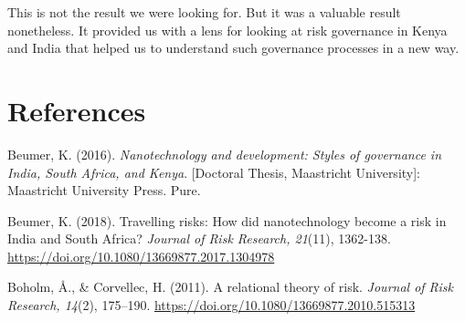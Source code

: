 \documentclass[authordate, empirical]{jote-new-article}
\begin{document}
	This is not the result we were looking for. But it was a valuable result nonetheless. It provided us with a lens for looking at risk governance in Kenya and India that helped us to understand such governance processes in a new way.






	\section{References}



	Beumer, K. (2016). \emph{Nanotechnology and development: Styles of governance in India, South Africa, and Kenya}. [Doctoral Thesis, Maastricht University]: Maastricht University Press. Pure.



	Beumer, K. (2018). Travelling risks: How did nanotechnology become a risk in India and South Africa? \emph{Journal of Risk Research, 21}(11), 1362-138. \url{https://doi.org/10.1080/13669877.2017.1304978}



	Boholm, Å., \& Corvellec, H. (2011). A relational theory of risk. \emph{Journal of Risk Research, 14}(2), 175--190. \url{https://doi.org/10.1080/13669877.2010.515313}
\end{document}
